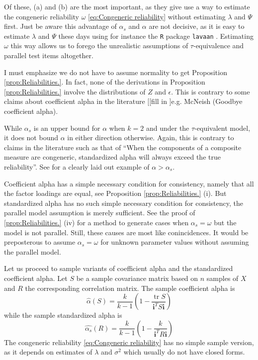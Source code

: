 \documentclass{article}
\theoremstyle{plain}
\theoremstyle{plain}
\theoremstyle{definition}
\theoremstyle{remark}
\theoremstyle{definition}
\theoremstyle{plain}
\theoremstyle{plain}
\theoremstyle{definition}
\DeclareMathOperator{\tr}{tr}
\begin{document}
Of these, (a) and (b) are the most important, as they give use a way to estimate the congeneric reliability $\omega$ \eqref{eq:Congeneric reliability} without estimating $\lambda$ and $\Psi$ first. Just be aware this advantage of $\alpha_s$ and $\alpha$ are not decisive, as it is easy to estimate $\lambda$ and $\Psi$ these days using for instance the \texttt{R} \citep{Team2013-tt} package \texttt{lavaan} \citep{Rosseel2012-yg}. Estimating $\omega$ this way allows us to forego the unrealistic assumptions of $\tau$-equivalence and parallel test items altogether.

I must emphasize we do not have to assume normality to get Proposition \ref{prop:Reliabilities.}. In fact, none of the derivations in Proposition \ref{prop:Reliabilities.} involve the distributions of $Z$ and $\epsilon$. This is contrary to some claims about coefficient alpha in the literature [[fill in ]e.g. McNeish (Goodbye coefficient alpha). 

While $\alpha_s$ is an upper bound for $\alpha$ when $k = 2$ and under the $\tau$-equivalent model, it does not bound $\alpha$ in either direction otherwise. Again, this is contrary to claims in the literature such as that of \citep[][p. 348]{Osburn2000-jd} \enquote{When the components of a composite measure are congeneric, standardized alpha will always exceed the true reliability}. See \citet[][p.450]{Falk2011-ae} for a clearly laid out example of $\alpha>\alpha_s$.

Coefficient alpha has a simple necessary condition for consistency, namely that all the factor loadings are equal, see Proposition \ref{prop:Reliabilities.} (i). But standardized alpha has no such simple necessary condition for consistency, the parallel model assumption is merely sufficient. See the proof of \ref{prop:Reliabilities.} (iv) for a method to generate cases when $\alpha_s = \omega$ but the model is not parallel. Still, these causes are most like conincidences. It would be preposterous to assume $\alpha_s = \omega$ for unknown parameter values without assuming the parallel model.

Let us proceed to sample variants of coefficient alpha and the standardized
coefficient alpha. Let $S$ be a sample covariance matrix based on
$n$ samples of $X$ and $R$ the corresponding correlation matrix.
The sample coefficient alpha is 
\begin{equation}
\widehat{\alpha}\left(S\right)=\frac{k}{k-1}\left(1-\frac{\tr{S}}{\mathbf{i}^{T}S\mathbf{i}}\right)\label{eq:sample coefficient alpha}
\end{equation}
while the sample standardized alpha is
\begin{equation}
\widehat{\alpha_s}(R)=\frac{k}{k-1}\left(1-\frac{k}{\mathbf{i}^{T}R\mathbf{i}}\right)\label{eq:sample standardized alpha}
\end{equation}
The congeneric reliability \eqref{eq:Congeneric reliability} has no
simple sample version, as it depends on estimates of $\lambda$ and
$\sigma^{2}$ which usually do not have closed forms.
\end{document}
